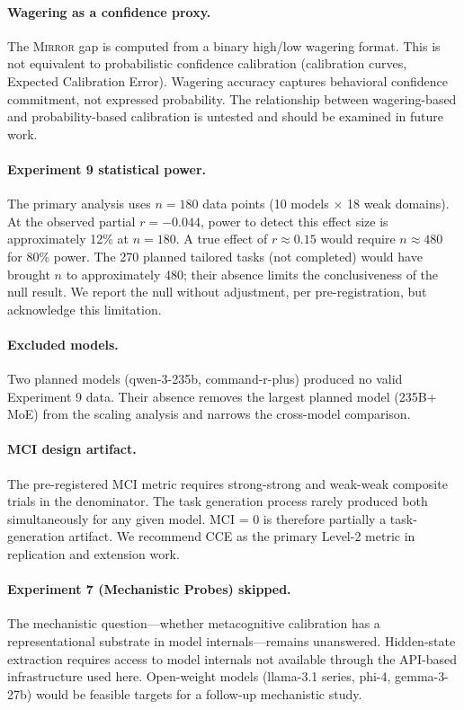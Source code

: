 \documentclass[10pt]{article}
\newcommand{\mirror}{\textsc{Mirror}}
\newcommand{\MCI}{MCI}
\newcommand{\CCE}{CCE}
\begin{document}
\paragraph{Wagering as a confidence proxy.}
The \mirror{} gap is computed from a binary high/low wagering format. This is not
equivalent to probabilistic confidence calibration (calibration curves, Expected
Calibration Error). Wagering accuracy captures behavioral confidence commitment,
not expressed probability. The relationship between wagering-based and probability-based
calibration is untested and should be examined in future work.

\paragraph{Experiment 9 statistical power.}
The primary analysis uses $n = 180$ data points (10 models $\times$ 18 weak domains).
At the observed partial $r = -0.044$, power to detect this effect size is approximately
12\% at $n = 180$. A true effect of $r \approx 0.15$ would require $n \approx 480$ for
80\% power. The 270 planned tailored tasks (not completed) would have brought $n$ to
approximately 480; their absence limits the conclusiveness of the null result. We report
the null without adjustment, per pre-registration, but acknowledge this limitation.

\paragraph{Excluded models.}
Two planned models (qwen-3-235b, command-r-plus) produced no valid Experiment 9 data.
Their absence removes the largest planned model (235B+ MoE) from the scaling analysis
and narrows the cross-model comparison.

\paragraph{MCI design artifact.}
The pre-registered \MCI{} metric requires strong-strong and weak-weak composite trials
in the denominator. The task generation process rarely produced both simultaneously for
any given model. \MCI{} = 0 is therefore partially a task-generation artifact. We
recommend \CCE{} as the primary Level-2 metric in replication and extension work.

\paragraph{Experiment 7 (Mechanistic Probes) skipped.}
The mechanistic question---whether metacognitive calibration has a representational
substrate in model internals---remains unanswered. Hidden-state extraction requires
access to model internals not available through the API-based infrastructure used here.
Open-weight models (llama-3.1 series, phi-4, gemma-3-27b) would be feasible targets
for a follow-up mechanistic study.
\end{document}
